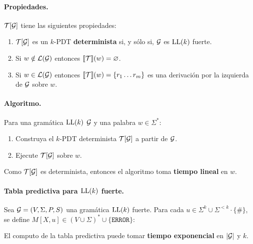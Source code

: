     \paragraph{Propiedades.} $\mathcal{T}[\mathcal{G}]$ tiene las siguientes propiedades:
    \begin{enumerate}
        \item $\mathcal{T}[\mathcal{G}]$ es un $k$-PDT \textbf{determinista} si, y sólo si, $\mathcal{G}$ es $\text{LL}(k)$ fuerte.
        \item Si $w \notin \mathcal{L}(\mathcal{G})$ entonces $\llbracket \mathcal{T} \rrbracket (w) = \varnothing$.
        \item Si $w \in \mathcal{L}(\mathcal{G})$ entonces $\llbracket \mathcal{T} \rrbracket(w) = \{r_1 \ldots r_m\}$ es una derivación por la izquierda de $\mathcal{G}$ sobre $w$.
    \end{enumerate}

    \paragraph{Algoritmo.} Para una gramática $\text{LL}(k)$ $\mathcal{G}$ y una palabra $w \in \Sigma^*$:
    \begin{enumerate}
        \item Construya el $k$-PDT determinista $\mathcal{T}[\mathcal{G}]$ a partir de $\mathcal{G}$.
        \item Ejecute $\mathcal{T}[\mathcal{G}]$ sobre $w$.
    \end{enumerate}

    Como $\mathcal{T}[\mathcal{G}]$ es determinista, entonces el algoritmo toma \textbf{tiempo lineal} en $w$.

    \paragraph{Tabla predictiva para $\text{LL}(k)$ fuerte.} Sea $\mathcal{G}=(V,\Sigma, P, S)$ una gramática $\text{LL}(k)$ fuerte. Para cada $u \in \Sigma^k \cup \Sigma^{<k}\cdot \{\#\}$, se define $M[X,u] \in (V\cup \Sigma)^* \cup \{\texttt{ERROR}\}$:

    El computo de la tabla predictiva puede tomar \textbf{tiempo exponencial} en $|\mathcal{G}|$ y $k$.

